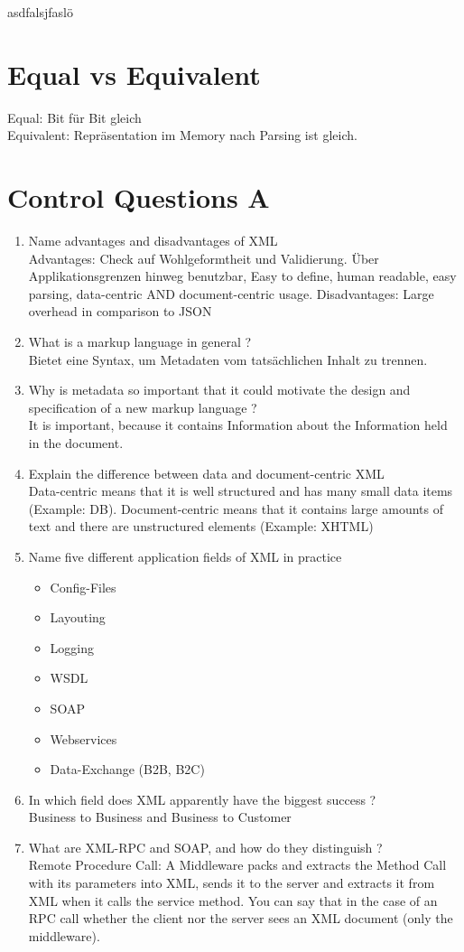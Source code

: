 asdfalsjfaslö

\section{Equal vs Equivalent}
Equal: Bit für Bit gleich\\
Equivalent: Repräsentation im Memory nach Parsing ist gleich.











\section{Control Questions A}
\begin{enumerate}
\item Name advantages and disadvantages of XML\\
Advantages: Check auf Wohlgeformtheit und Validierung. Über Applikationsgrenzen hinweg benutzbar, Easy to define, human readable, easy parsing, data-centric AND document-centric usage. Disadvantages: Large overhead in comparison to JSON
\item What is a markup language in general ?\\
Bietet eine Syntax, um Metadaten vom tatsächlichen Inhalt zu trennen.
\item Why is metadata so important that it could motivate the design and specification of a new markup language ?\\
It is important, because it contains Information about the Information held in the document.
\item Explain the difference between data and document-centric XML\\
Data-centric means that it is well structured and has many small data items (Example: DB). Document-centric means that it contains large amounts of text and there are unstructured elements (Example: XHTML)
\item Name five different application fields of XML in practice
\begin{itemize}
\item Config-Files
\item Layouting
\item Logging
\item WSDL
\item SOAP
\item Webservices
\item Data-Exchange (B2B, B2C)
\end{itemize}
\item In which field does XML apparently have the biggest success ?\\
Business to Business and Business to Customer
\item What are XML-RPC and SOAP, and how do they distinguish ?\\
Remote Procedure Call: A Middleware packs and extracts the Method Call with its parameters into XML, sends it to the server and extracts it from XML when it calls the service method. You can say that in the case of an RPC call whether the client nor the server sees an XML document (only the middleware).


\end{enumerate}
